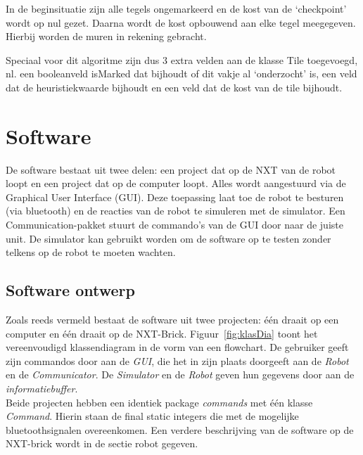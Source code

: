 \documentclass[tt3]{penoverslag}
\begin{document}
In de beginsituatie zijn alle tegels ongemarkeerd en de kost van de `checkpoint' wordt op nul gezet. Daarna wordt de kost opbouwend aan elke tegel meegegeven. Hierbij worden de muren in rekening gebracht.

Speciaal voor dit algoritme zijn dus 3 extra velden aan de klasse Tile toegevoegd, nl. een booleanveld isMarked dat bijhoudt of dit vakje al `onderzocht' is, een veld dat de heuristiekwaarde bijhoudt en een veld dat de kost van de tile bijhoudt.

\section{Software} %
\label{sec:softw}
De software bestaat uit twee delen: een project dat op de NXT van de robot loopt en een project dat op de computer loopt. Alles wordt aangestuurd via de Graphical User Interface (GUI). Deze toepassing laat toe de robot te besturen (via bluetooth) en de reacties van de robot te simuleren met de simulator. Een Communication-pakket stuurt de commando's van de GUI door naar de juiste unit.
De simulator kan gebruikt worden om de software op te testen zonder telkens op de robot te moeten wachten.

\subsection{Software ontwerp} %
\label{ssec:Sdesign}
Zoals reeds vermeld bestaat de software uit twee projecten: \'e\'en draait op een computer en \'e\'en draait op de NXT-Brick. Figuur~\ref{fig:klasDia} toont het vereenvoudigd klassendiagram in de vorm van een flowchart. De gebruiker geeft zijn commandos door aan de \textit{GUI}, die het in zijn plaats doorgeeft aan de \textit{Robot} en de \textit{Communicator}. De \textit{Simulator} en de \textit{Robot} geven hun gegevens door aan de \textit{informatiebuffer}. \\
Beide projecten hebben een identiek package \textit{commands} met \'e\'en klasse \textit{Command}. Hierin staan de final static integers die met de mogelijke bluetoothsignalen overeenkomen. Een verdere beschrijving van de software op de NXT-brick wordt in de sectie robot gegeven.\\
\end{document}
